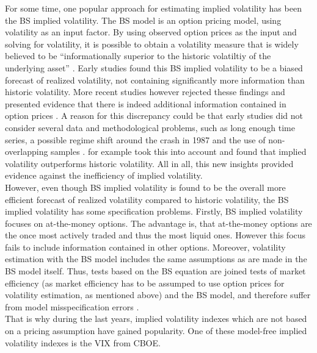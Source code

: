 For some time, one popular approach for estimating implied volatility has been the \gls{BS} implied volatility. The \gls{BS} model is an option pricing model, using volatility as an input factor. By using observed option prices as the input and solving for volatility, it is possible to obtain a volatility measure that is widely believed to be ``informationally superior to the historic volatiltiy of the underlying asset'' \parencite[p.1305]{jiang2003}. Early studies found this \gls{BS} implied volatility to be a biased forecast of realized volatility, not containing significantly more information than historic volatility. More recent studies however rejected thesse findings and presented evidence that there is indeed additional information contained in option prices \parencite{jiang2003}. A reason for this discrepancy could be that early studies did not consider several data and methodological problems, such as long enough time series, a possible regime shift around the crash in 1987 and the use of non-overlapping samples \parencite{jiang2003}. \citeauthor{christensen1998} for example took this into account and found that implied volatility outperforms historic volatility. All in all, this new insights provided evidence against the inefficiency of implied volatility.\\
However, even though \gls{BS} implied volatility is found to be the overall more efficient forecast of realized volatility compared to historic volatility, the \gls{BS} implied volatility has some specification problems. Firstly, \gls{BS} implied volatility focuses on at-the-money options. The advantage is, that at-the-money options are the once most actively traded and thus the most liquid ones. However this focus fails to include information contained in other options. Moreover, volatility estimation with the \gls{BS} model includes the same assumptions as are made in the \gls{BS} model itself. Thus, tests based on the \gls{BS} equation are joined tests of market efficiency (as market efficiency has to be assumped to use option prices for volatility estimation, as mentioned above) and the \gls{BS} model, and therefore suffer from model misspecification errors \parencite{jiang2003}. \\
That is why during the last years, implied volatility indexes which are not based on a pricing assumption have gained popularity. One of these model-free implied volatility indexes is the VIX from \gls{CBOE}.





